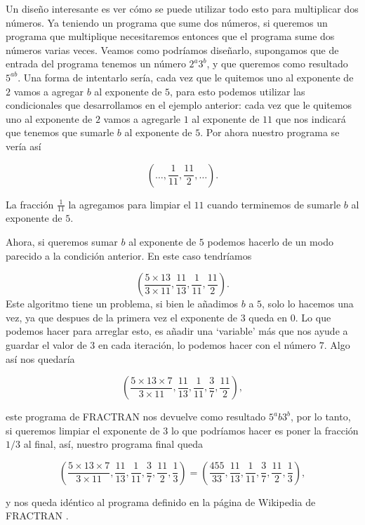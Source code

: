 Un diseño interesante es ver c\'omo se puede utilizar todo esto para multiplicar dos n\'umeros. Ya teniendo un programa que sume dos n\'umeros, si queremos un programa que multiplique necesitaremos entonces que el programa sume dos n\'umeros varias veces. Veamos como podr\'iamos diseñarlo, supongamos que de entrada del programa tenemos un n\'umero $2^a3^b$, y que queremos como resultado $5^{ab}$. Una forma de intentarlo ser\'ia, cada vez que le quitemos uno al exponente de $2$ vamos a agregar $b$ al exponente de $5$, para esto podemos utilizar las condicionales que desarrollamos en el ejemplo anterior: cada vez que le quitemos uno al exponente de $2$ vamos a agregarle $1$ al exponente de $11$ que nos indicar\'a que tenemos que sumarle $b$ al exponente de $5$. Por ahora nuestro programa se ver\'ia as\'i

\[
    \left(\dots,\frac{1}{11},\frac{11}{2},\dots\right).
\]

La fracci\'on $\frac{1}{11}$ la agregamos para limpiar el $11$ cuando terminemos de sumarle $b$ al exponente de $5$.

Ahora, si queremos sumar $b$ al exponente de $5$ podemos hacerlo de un modo parecido a la condici\'on anterior. En este caso tendr\'iamos 

\[
    \left(\frac{5\times 13}{3\times 11}, \frac{11}{13}, \frac{1}{11},\frac{11}{2}\right).
\]
Este algoritmo tiene un problema, si bien le añadimos $b$ a $5$, solo lo hacemos una vez, ya que despues de la primera vez el exponente de $3$ queda en $0$. Lo que podemos hacer para arreglar esto, es añadir una `variable' m\'as que nos ayude a guardar el valor de $3$ en cada iteraci\'on, lo podemos hacer con el n\'umero $7$. Algo as\'i nos quedar\'ia

\[
    \left(\frac{5\times 13\times 7}{3\times 11}, \frac{11}{13}, \frac{1}{11}, \frac{3}{7},\frac{11}{2}\right),
\]

este programa de FRACTRAN nos devuelve como resultado $5^ab3^b$, por lo tanto, si queremos limpiar el exponente de $3$ lo que podr\'iamos hacer es poner la fracci\'on $1/3$ al final, as\'i, nuestro programa final queda

\[
    \left(\frac{5\times 13\times 7}{3\times 11}, \frac{11}{13}, \frac{1}{11}, \frac{3}{7},\frac{11}{2}, \frac{1}{3}\right) = \left(\frac{455}{33}, \frac{11}{13}, \frac{1}{11}, \frac{3}{7},\frac{11}{2}, \frac{1}{3}\right),
\]

y nos queda id\'entico al programa definido en la p\'agina de Wikipedia de FRACTRAN \cite{wiki:FRACTRAN}.

